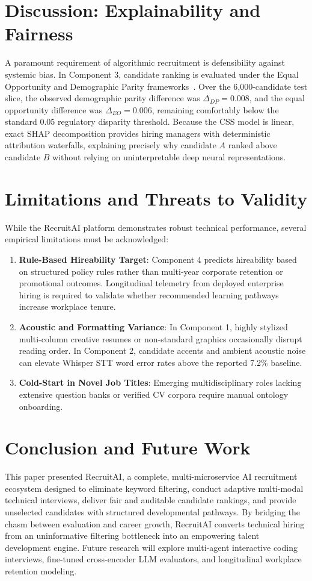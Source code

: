 \documentclass[conference]{IEEEtran}
\begin{document}
\section{Discussion: Explainability and Fairness}
A paramount requirement of algorithmic recruitment is defensibility against systemic bias. In Component 3, candidate ranking is evaluated under the Equal Opportunity and Demographic Parity frameworks~\cite{hardt2016equality, zehlike2017fair}. Over the 6,000-candidate test slice, the observed demographic parity difference was $\Delta_{DP} = 0.008$, and the equal opportunity difference was $\Delta_{EO} = 0.006$, remaining comfortably below the standard 0.05 regulatory disparity threshold. Because the CSS model is linear, exact SHAP decomposition provides hiring managers with deterministic attribution waterfalls, explaining precisely why candidate $A$ ranked above candidate $B$ without relying on uninterpretable deep neural representations.

\section{Limitations and Threats to Validity}
While the RecruitAI platform demonstrates robust technical performance, several empirical limitations must be acknowledged:
\begin{enumerate}
    \item \textbf{Rule-Based Hireability Target}: Component 4 predicts hireability based on structured policy rules rather than multi-year corporate retention or promotional outcomes. Longitudinal telemetry from deployed enterprise hiring is required to validate whether recommended learning pathways increase workplace tenure.
    \item \textbf{Acoustic and Formatting Variance}: In Component 1, highly stylized multi-column creative resumes or non-standard graphics occasionally disrupt reading order. In Component 2, candidate accents and ambient acoustic noise can elevate Whisper STT word error rates above the reported 7.2\% baseline.
    \item \textbf{Cold-Start in Novel Job Titles}: Emerging multidisciplinary roles lacking extensive question banks or verified CV corpora require manual ontology onboarding.
\end{enumerate}

\section{Conclusion and Future Work}
This paper presented RecruitAI, a complete, multi-microservice AI recruitment ecosystem designed to eliminate keyword filtering, conduct adaptive multi-modal technical interviews, deliver fair and auditable candidate rankings, and provide unselected candidates with structured developmental pathways. By bridging the chasm between evaluation and career growth, RecruitAI converts technical hiring from an uninformative filtering bottleneck into an empowering talent development engine. Future research will explore multi-agent interactive coding interviews, fine-tuned cross-encoder LLM evaluators, and longitudinal workplace retention modeling.
\end{document}
